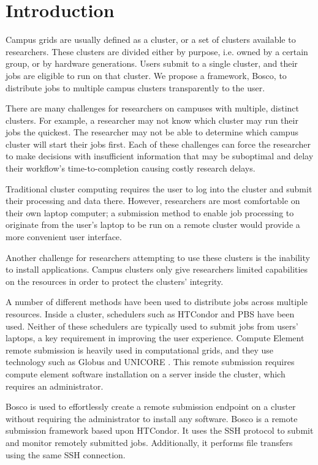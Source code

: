 \label{chapter:campusjobs} 
\section{Introduction}

Campus grids are usually defined as a cluster, or a set of clusters available to researchers.  These clusters are divided either by purpose, i.e. owned by a certain group, or by hardware generations.  Users submit to a single cluster, and their jobs are eligible to run on that cluster.  We propose a framework, Bosco, to distribute jobs to multiple campus clusters transparently to the user. 

There are many challenges for researchers on campuses with multiple, distinct clusters.  For example, a researcher may not know which cluster may run their jobs the quickest.  The researcher may not be able to determine which campus cluster will start their jobs first.  Each of these challenges can force the researcher to make decisions with insufficient information that may be suboptimal and delay their workflow's time-to-completion causing costly research delays.

Traditional cluster computing requires the user to log into the cluster and submit their processing and data there. However, researchers are most comfortable on their own laptop computer; a submission method to enable job processing to originate from the user's laptop to be run on a remote cluster would provide a more convenient user interface.

Another challenge for researchers attempting to use these clusters is the inability to install applications.  Campus clusters only give researchers limited capabilities on the resources in order to protect the clusters' integrity.

A number of different methods have been used to distribute jobs across multiple resources.  Inside a cluster, schedulers such as HTCondor  \cite{litzkow1988condor} and PBS \cite{henderson1995job} have been used.  Neither of these schedulers are typically used to submit jobs from users' laptops, a key requirement in improving the user experience.  Compute Element remote submission is heavily used in computational grids, and they use technology such as Globus \cite{foster2001globus} and UNICORE \cite{romberg2002unicore}. This remote submission requires compute element software installation on a server inside the cluster, which requires an administrator.

Bosco \cite{weitzel2014accessing} is used to effortlessly create a remote submission endpoint on a cluster without requiring the administrator to install any software.  Bosco is a remote submission framework based upon HTCondor.  It uses the SSH \cite{ylonen2006secure} protocol to submit and monitor remotely submitted jobs.  Additionally, it performs file transfers using the same SSH connection.

